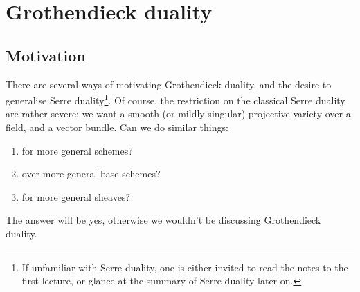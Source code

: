 \documentclass[10pt,a4paper]{article}
\begin{document}
\section{Grothendieck duality}
\label{section:grothendieck-duality}
\subsection{Motivation}
\label{subsection:motivation}
There are several ways of motivating Grothendieck duality, and the desire to generalise Serre duality\footnote{If unfamiliar with Serre duality, one is either invited to read the notes to the first lecture, or glance at the summary of Serre duality later on.}. Of course, the restriction on the classical Serre duality are rather severe: we want a smooth (or mildly singular) projective variety over a field, and a vector bundle. Can we do similar things:
\begin{enumerate}
  \item for more general schemes? 
  \item over more general base schemes?
  \item for more general sheaves?
\end{enumerate}
The answer will be yes, otherwise we wouldn't be discussing Grothendieck duality.
\end{document}
